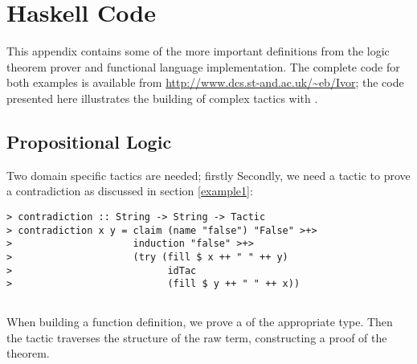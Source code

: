 \section{Haskell Code}

This appendix contains some of the more important definitions from the
logic theorem prover and functional language implementation. The
complete code for both examples is available from
\url{http://www.dcs.st-and.ac.uk/~eb/Ivor}; the code presented here
illustrates the building of complex tactics with \Ivor{}.

\subsection{Propositional Logic}

Two domain specific tactics are needed; firstly
Secondly, we need a tactic to prove a contradiction as discussed in
section \ref{example1}:

\begin{verbatim}
> contradiction :: String -> String -> Tactic
> contradiction x y = claim (name "false") "False" >+>
>                     induction "false" >+>
>                     (try (fill $ x ++ " " ++ y)
>                           idTac
>                           (fill $ y ++ " " ++ x))
\end{verbatim}

\subsection{\Funl{}}

\label{funlapp}

When building a function definition, we prove a  of the
appropriate type. Then the  tactic traverses the
structure of the raw term, constructing a proof of the
theorem.

